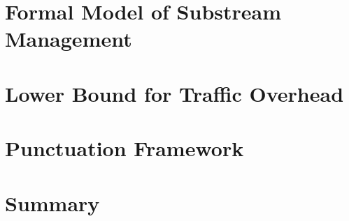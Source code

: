 

\section{Formal Model of Substream Management}
\label{fs-acker-preliminaries}


\section{Lower Bound for Traffic Overhead}
\label{fs-acker-optimal}


\section{Punctuation Framework}
\label{fs-acker-punctuations}


\section{Summary}
\label{fs-acker-summary}
